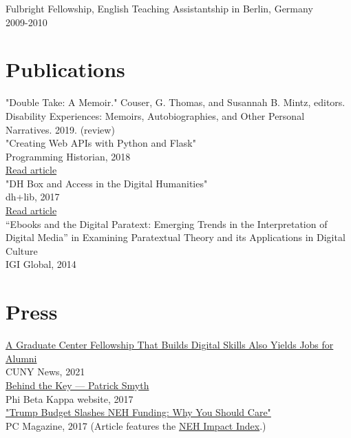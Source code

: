 \documentclass[11pt]{article}
\begin{document}
Fulbright Fellowship, English Teaching Assistantship in Berlin, Germany\\
2009-2010\\

\section*{Publications}
\label{sec:orgheadline5}
"Double Take: A Memoir." Couser, G. Thomas, and Susannah B. Mintz, editors. Disability Experiences: Memoirs, Autobiographies, and Other Personal Narratives. 2019. (review)\\

"Creating Web APIs with Python and Flask"\\
Programming Historian, 2018\\
\href{https://programminghistorian.org/lessons/creating-apis-with-python-and-flask}{Read article}\\

"DH Box and Access in the Digital Humanities"\\
dh+lib, 2017\\
\href{http://acrl.ala.org/dh/2017/06/21/dh-box-and-access-in-the-digital-humanities/}{Read article}\\

“Ebooks and the Digital Paratext: Emerging Trends in the Interpretation of Digital Media” in Examining Paratextual Theory and its Applications in Digital Culture\\
IGI Global, 2014\\


\section*{Press}
\label{sec:orgheadline6}
\href{https://m.gc.cuny.edu/News/Detail?id=60526}{A Graduate Center Fellowship That Builds Digital Skills Also Yields Jobs for Alumni}\\
CUNY News, 2021\\

\href{https://www.pbk.org/Behind-the-Key/Patrick-Smyth}{Behind the Key — Patrick Smyth}\\
Phi Beta Kappa website, 2017\\

\href{http://www.pcmag.com/commentary/353904/trump-budget-slashes-neh-funding-why-you-should-care}{"Trump Budget Slashes NEH Funding: Why You Should Care"}\\
PC Magazine, 2017 (Article features the \href{http://www.nehimpact.org/}{NEH Impact Index}.)\\
\end{document}
